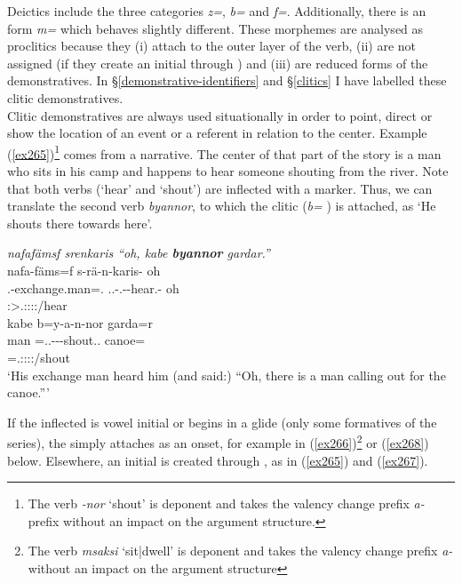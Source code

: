 Deictics include the three categories  \emph{z=},  \emph{b=} and  \emph{f=}. Additionally, there is an  form \emph{m=} which behaves slightly different. These morphemes are analysed as proclitics because they (i) attach to the outer layer of the verb, (ii) are not assigned  (if they create an initial  through ) and (iii) are reduced forms of the demonstratives. In \S{}\ref{demonstrative-identifiers} and \S{}\ref{clitics} I have labelled these clitic demonstratives.\\

Clitic demonstratives are always used situationally in order to point, direct or show the location of an event or a referent in relation to the  center. Example (\ref{ex265})\footnote{The verb \emph{-nor} `shout' is deponent and takes the valency change prefix \emph{a-} prefix without an impact on the argument structure.} comes from a narrative. The  center of that part of the story is a man who sits in his camp and happens to hear someone shouting from the river. Note that both verbs (`hear' and `shout') are inflected with a  marker. Thus, we can translate the second verb \emph{byannor}, to which the  clitic  (\emph{b=} \Med) is attached, as `He shouts there towards here'.

\begin{exe}
	\ex \emph{nafafämsf srenkaris ``oh, kabe \textbf{byannor} gardar.''}\\
	\glll nafa-fäms=f s-rä-n-karis-\Zero{} oh\\
	\Third.\Poss-exchange.man=\Erg.\Sg{} \Tsg.\Masc.\Bet-\Irr.\Ndu-\Venit-hear.\Rs-\Stsg{} oh\\
	{} \footnotesize{\Stsg:\Sbj>\Tsg.\Masc:\Obj:\Irr:\Pfv:\Venit/hear} {}\\
	\sn
	\glll kabe b=y-a-n-nor garda=r\\
	man \Med=\Tsg.\Masc.\Alph-\Vc-\Venit-shout.\Ext.\Ndu{} canoe=\Purp{}\\
	{} \footnotesize{\Med=\Tsg.\Masc:\Sbj:\Nonpast:\Ipfv:\Venit/shout} {}\\
	\trans `His exchange man heard him (and said:) ``Oh, there is a man calling out for the canoe.'''
	\label{ex265}
\end{exe}

If the inflected  is vowel initial or begins in a glide (only some formatives of the \Alph{} series), the   simply attaches as an onset, for example in (\ref{ex266})\footnote{The verb \emph{msaksi} `sit|dwell' is deponent and takes the valency change prefix \emph{a-} without an impact on the argument structure} or (\ref{ex268}) below. Elsewhere, an initial  is created through , as in (\ref{ex265}) and (\ref{ex267}).


